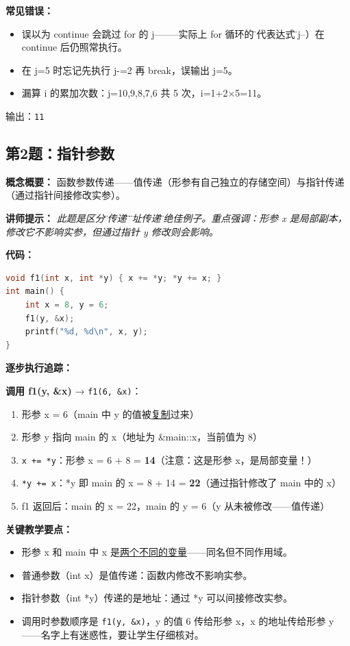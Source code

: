 \textbf{常见错误：}
\begin{itemize}
    \item 误以为 continue 会跳过 for 的 j--——实际上 for 循环的\"迭代表达式\"（j--）在 continue 后仍照常执行。
    \item 在 j=5 时忘记先执行 j-=2 再 break，误输出 j=5。
    \item 漏算 i 的累加次数：j=10,9,8,7,6 共 5 次，i=1+2×5=11。
\end{itemize}

{\color{highlight}输出：\texttt{11}}

\subsection{第2题：指针参数}

\textbf{概念概要：} 函数参数传递——值传递（形参有自己独立的存储空间）与指针传递（通过指针间接修改实参）。

\medskip
\textbf{讲师提示：} \textit{此题是区分\"值传递\"和\"地址传递\"的绝佳例子。重点强调：形参 x 是局部副本，修改它不影响实参，但通过指针 y 修改则会影响。}

\smallskip
\textbf{代码：}
\begin{lstlisting}[language=C]
void f1(int x, int *y) { x += *y; *y += x; }
int main() {
    int x = 8, y = 6;
    f1(y, &x);
    printf("%d, %d\n", x, y);
}
\end{lstlisting}

\smallskip
\textbf{逐步执行追踪：}

\noindent \textbf{调用 f1(y, \&x)} → \texttt{f1(6, \&x)}：
\begin{enumerate}
    \item 形参 x = 6（main 中 y 的值被\underline{复制}过来）
    \item 形参 y 指向 main 的 x（地址为 \&main::x，当前值为 8）
    \item \texttt{x += *y}：形参 x = 6 + 8 = \textbf{14}（注意：这是形参 x，是局部变量！）
    \item \texttt{*y += x}：*y 即 main 的 x = 8 + 14 = \textbf{22}（通过指针修改了 main 中的 x）
    \item f1 返回后：main 的 x = 22，main 的 y = 6（y 从未被修改——值传递）
\end{enumerate}

\textbf{关键教学要点：}
\begin{itemize}
    \item 形参 x 和 main 中 x 是\underline{两个不同的变量}——同名但不同作用域。
    \item 普通参数（int x）是值传递：函数内修改不影响实参。
    \item 指针参数（int *y）传递的是地址：通过 *y 可以间接修改实参。
    \item 调用时参数顺序是 \texttt{f1(y, \&x)}，y 的值 6 传给形参 x，x 的地址传给形参 y——名字上有迷惑性，要让学生仔细核对。
\end{itemize}

